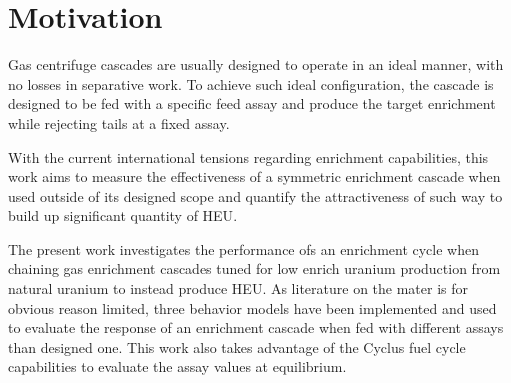 \section{Motivation}

Gas centrifuge cascades are usually designed to operate in an ideal manner, with
no losses in separative work. To achieve such ideal configuration, the cascade
is designed to be fed with a specific feed assay and produce the target
enrichment while rejecting tails at a fixed assay.

With the current international tensions regarding enrichment capabilities, this
work aims to measure the effectiveness of a symmetric enrichment cascade when
used outside of its designed scope and quantify the attractiveness of such way
to build up significant quantity of \gls{HEU}.

The present work investigates the performance ofs an enrichment cycle when chaining
gas enrichment cascades tuned for low enrich uranium production from natural
uranium to instead produce HEU. As literature on the mater is for obvious reason
limited, three behavior models have been implemented and used to evaluate the
response of an enrichment cascade when fed with different assays than designed one.
This work also takes advantage of the Cyclus\cite{cyclus} fuel cycle capabilities
to evaluate the assay values at equilibrium.
